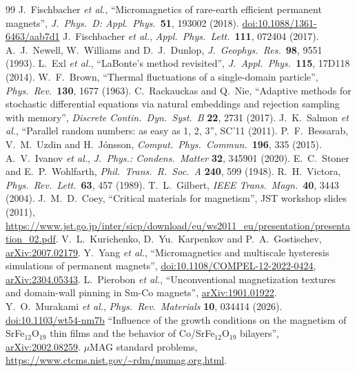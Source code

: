 \documentclass[10pt,a4paper]{article}
\begin{document}
\begin{thebibliography}{99}\small
{} J.~Fischbacher \emph{et al.}, ``Micromagnetics of rare-earth efficient permanent magnets'',
  \emph{J.\ Phys.\ D: Appl.\ Phys.}\ \textbf{51}, 193002 (2018). \href{https://doi.org/10.1088/1361-6463/aab7d1}{doi:10.1088/1361-6463/aab7d1}
 J.~Fischbacher \emph{et al.}, \emph{Appl.\ Phys.\ Lett.}\ \textbf{111}, 072404 (2017).
 A.~J.~Newell, W.~Williams and D.~J.~Dunlop, \emph{J.\ Geophys.\ Res.}\ \textbf{98}, 9551 (1993).
 L.~Exl \emph{et al.}, ``LaBonte's method revisited'', \emph{J.\ Appl.\ Phys.}\ \textbf{115}, 17D118 (2014).
 W.~F.~Brown, ``Thermal fluctuations of a single-domain particle'', \emph{Phys.\ Rev.}\ \textbf{130}, 1677 (1963).
 C.~Rackauckas and Q.~Nie, ``Adaptive methods for stochastic differential equations via natural
  embeddings and rejection sampling with memory'', \emph{Discrete Contin.\ Dyn.\ Syst.\ B} \textbf{22}, 2731 (2017).
 J.~K.~Salmon \emph{et al.}, ``Parallel random numbers: as easy as 1, 2, 3'', SC'11 (2011).
 P.~F.~Bessarab, V.~M.~Uzdin and H.~J\'onsson, \emph{Comput.\ Phys.\ Commun.}\ \textbf{196}, 335 (2015).
 A.~V.~Ivanov \emph{et al.}, \emph{J.\ Phys.: Condens.\ Matter} \textbf{32}, 345901 (2020).
 E.~C.~Stoner and E.~P.~Wohlfarth, \emph{Phil.\ Trans.\ R.\ Soc.\ A} \textbf{240}, 599 (1948).
 R.~H.~Victora, \emph{Phys.\ Rev.\ Lett.}\ \textbf{63}, 457 (1989).
 T.~L.~Gilbert, \emph{IEEE Trans.\ Magn.}\ \textbf{40}, 3443 (2004).
 J.~M.~D.~Coey, ``Critical materials for magnetism'', JST workshop slides (2011), \url{https://www.jst.go.jp/inter/sicp/download/eu/ws2011_eu/presentation/presentation_02.pdf}.
 V.~L.~Kurichenko, D.~Yu.~Karpenkov and P.~A.~Gostischev, \href{https://arxiv.org/abs/2007.02179}{arXiv:2007.02179}.
 Y.~Yang \emph{et al.}, ``Micromagnetics and multiscale hysteresis simulations of permanent magnets'',
  \href{https://doi.org/10.1108/COMPEL-12-2022-0424}{doi:10.1108/COMPEL-12-2022-0424}, \href{https://arxiv.org/abs/2304.05343}{arXiv:2304.05343}.
 L.~Pierobon \emph{et al.}, ``Unconventional magnetization textures and domain-wall pinning in Sm-Co magnets'', \href{https://arxiv.org/abs/1901.01922}{arXiv:1901.01922}.
 Y.~O.~Murakami \emph{et al.}, \emph{Phys.\ Rev.\ Materials} \textbf{10}, 034414 (2026). \href{https://doi.org/10.1103/wt54-nm7b}{doi:10.1103/wt54-nm7b}
 ``Influence of the growth conditions on the magnetism of SrFe$_{12}$O$_{19}$ thin films and the behavior of Co/SrFe$_{12}$O$_{19}$ bilayers'', \href{https://arxiv.org/abs/2002.08259}{arXiv:2002.08259}.
 $\mu$MAG standard problems, \url{https://www.ctcms.nist.gov/~rdm/mumag.org.html}.
\end{thebibliography}
\end{document}
